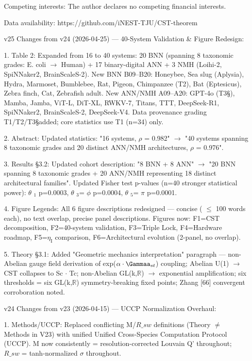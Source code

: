 \documentclass[a4paper,12pt]{article}
\providecommand{\textsubscript}[1]{\ensuremath{_{\text{#1}}}}
\begin{document}
Competing interests: The author declares no competing financial interests.

Data availability: https://github.com/iNEST-TJU/CST-theorem

v25 Changes from v24 (2026-04-25) --- 40-System Validation \& Figure Redesign:

1.
Table 2: Expanded from 16 to 40 systems: 20 BNN (spanning 8 taxonomic grades: E. coli  $\rightarrow$  Human) + 17 binary-digital ANN + 3 NMH (Loihi-2, SpiNNaker2, BrainScaleS-2).
New BNN B09--B20: Honeybee, Sea slug (Aplysia), Hydra, Marmoset, Bumblebee, Rat, Pigeon, Chimpanzee (T2\dag), Bat (Eptesicus), Zebra finch, Cat, Zebrafish adult.
New ANN/NMH A09--A20: GPT-4o (T3\S), Mamba, Jamba, ViT-L, DiT-XL, RWKV-7, Titans, TTT, DeepSeek-R1, SpiNNaker2, BrainScaleS-2, DeepSeek-V4.
Data provenance grading T1/T2\dag/T3\S added; core statistics use T1 (n=34) only.

2. Abstract: Updated statistics: "16 systems,  $\rho$  = 0.982"  $\rightarrow$  "40 systems spanning 8 taxonomic grades and 20 distinct ANN/NMH architectures,  $\rho$  = 0.976".

3. Results \S3.2: Updated cohort description: "8 BNN + 8 ANN"  $\rightarrow$  "20 BNN spanning 8 taxonomic grades + 20 ANN/NMH representing 18 distinct architectural families". Updated Fisher test p-values (n=40 stronger statistical power):  $\theta$ \textsubscript{1} p=0.0003,  $\theta$ \textsubscript{3}= $\phi$  p=0.0004,  $\theta$ \textsubscript{5}= $\pi$  p=0.0001.

4. Figure Legends: All 6 figure descriptions redesigned --- concise ( $\leq$ 100 words each), no text overlap, precise panel descriptions. Figures now: F1=CST decomposition, F2=40-system validation, F3=Triple Lock, F4=Hardware roadmap, F5=$\eta_{\text{I}}$ comparison, F6=Architectural evolution (2-panel, no overlap).

5. Theory \S3.1: Added "Geometric mechanics interpretation" paragraph --- non-Abelian gauge field derivation of exp($\alpha \cdot \Gammaa_{st}$) coupling; Abelian U(1)  $\rightarrow$  CST collapses to Sc $\cdot$ Tc; non-Abelian GL(k,$\mathbb{R}$)  $\rightarrow$  exponential amplification; six thresholds = six GL(k,$\mathbb{R}$) symmetry-breaking fixed points; Zhang [66] convergent corroboration noted.

v24 Changes from v23 (2026-04-15) --- UCCP Normalization Overhaul:

1. Methods/UCCP: Replaced conflicting M/$R\_{sw}$ definitions (Theory  $\neq$  Methods in V23) with unified Unified Cross-Species Computation Protocol (UCCP). M now consistently = resolution-corrected Louvain Q' throughout; $R\_{sw}$ = tanh-normalized  $\sigma$  throughout.
\end{document}
